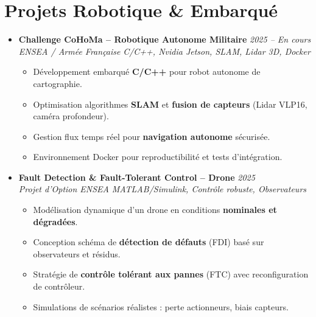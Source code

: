 \documentclass[a4paper,11pt]{article}
\begin{document}
\section{Projets Robotique \& Embarqué}
\begin{itemize}[leftmargin=*, label={-}]

\item \textbf{Challenge CoHoMa -- Robotique Autonome Militaire} \hfill \textit{2025 -- En cours} \\
\textit{ENSEA / Armée Française} \hfill \textit{C/C++, Nvidia Jetson, SLAM, Lidar 3D, Docker}
\vspace{-2pt}
    \begin{itemize}[leftmargin=0.4cm, nosep, label=\tiny$\bullet$]
        \item \small{Développement embarqué \textbf{C/C++} pour robot autonome de cartographie.}
        \item \small{Optimisation algorithmes \textbf{SLAM} et \textbf{fusion de capteurs} (Lidar VLP16, caméra profondeur).}
        \item \small{Gestion flux temps réel pour \textbf{navigation autonome} sécurisée.}
        \item \small{Environnement Docker pour reproductibilité et tests d'intégration.}
    \end{itemize}
\vspace{3pt}

\item \textbf{Fault Detection \& Fault-Tolerant Control -- Drone} \hfill \textit{2025} \\
\textit{Projet d'Option ENSEA} \hfill \textit{MATLAB/Simulink, Contrôle robuste, Observateurs}
\vspace{-2pt}
    \begin{itemize}[leftmargin=0.4cm, nosep, label=\tiny$\bullet$]
        \item \small{Modélisation dynamique d'un drone en conditions \textbf{nominales et dégradées}.}
        \item \small{Conception schéma de \textbf{détection de défauts} (FDI) basé sur observateurs et résidus.}
        \item \small{Stratégie de \textbf{contrôle tolérant aux pannes} (FTC) avec reconfiguration de contrôleur.}
        \item \small{Simulations de scénarios réalistes : perte actionneurs, biais capteurs.}
    \end{itemize}
\vspace{3pt}


\end{itemize}
\end{document}
